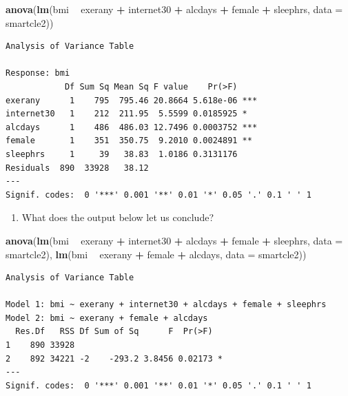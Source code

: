 \documentclass[]{book}
\newenvironment{Shaded}{\begin{snugshade}}{\end{snugshade}}
\newcommand{\KeywordTok}[1]{\textcolor[rgb]{0.13,0.29,0.53}{\textbf{#1}}}
\newcommand{\DataTypeTok}[1]{\textcolor[rgb]{0.13,0.29,0.53}{#1}}
\newcommand{\StringTok}[1]{\textcolor[rgb]{0.31,0.60,0.02}{#1}}
\newcommand{\OperatorTok}[1]{\textcolor[rgb]{0.81,0.36,0.00}{\textbf{#1}}}
\newcommand{\NormalTok}[1]{#1}
\providecommand{\tightlist}{%
  \setlength{\itemsep}{0pt}\setlength{\parskip}{0pt}}
\theoremstyle{definition}
\theoremstyle{definition}
\theoremstyle{definition}
\theoremstyle{remark}
\begin{document}
\begin{Shaded}
\begin{Highlighting}[]
\KeywordTok{anova}\NormalTok{(}\KeywordTok{lm}\NormalTok{(bmi }\OperatorTok{~}\StringTok{ }\NormalTok{exerany }\OperatorTok{+}\StringTok{ }\NormalTok{internet30 }\OperatorTok{+}\StringTok{ }\NormalTok{alcdays }\OperatorTok{+}\StringTok{ }\NormalTok{female }\OperatorTok{+}\StringTok{ }\NormalTok{sleephrs,}
         \DataTypeTok{data =}\NormalTok{ smartcle2))}
\end{Highlighting}
\end{Shaded}

\begin{verbatim}
Analysis of Variance Table

Response: bmi
            Df Sum Sq Mean Sq F value    Pr(>F)    
exerany      1    795  795.46 20.8664 5.618e-06 ***
internet30   1    212  211.95  5.5599 0.0185925 *  
alcdays      1    486  486.03 12.7496 0.0003752 ***
female       1    351  350.75  9.2010 0.0024891 ** 
sleephrs     1     39   38.83  1.0186 0.3131176    
Residuals  890  33928   38.12                      
---
Signif. codes:  0 '***' 0.001 '**' 0.01 '*' 0.05 '.' 0.1 ' ' 1
\end{verbatim}

\begin{enumerate}
\def\labelenumi{\arabic{enumi}.}
\setcounter{enumi}{2}
\tightlist
\item
  What does the output below let us conclude?
\end{enumerate}

\begin{Shaded}
\begin{Highlighting}[]
\KeywordTok{anova}\NormalTok{(}\KeywordTok{lm}\NormalTok{(bmi }\OperatorTok{~}\StringTok{ }\NormalTok{exerany }\OperatorTok{+}\StringTok{ }\NormalTok{internet30 }\OperatorTok{+}\StringTok{ }\NormalTok{alcdays }\OperatorTok{+}\StringTok{ }\NormalTok{female }\OperatorTok{+}\StringTok{ }\NormalTok{sleephrs, }
         \DataTypeTok{data =}\NormalTok{ smartcle2),}
      \KeywordTok{lm}\NormalTok{(bmi }\OperatorTok{~}\StringTok{ }\NormalTok{exerany }\OperatorTok{+}\StringTok{ }\NormalTok{female }\OperatorTok{+}\StringTok{ }\NormalTok{alcdays, }
         \DataTypeTok{data =}\NormalTok{ smartcle2))}
\end{Highlighting}
\end{Shaded}

\begin{verbatim}
Analysis of Variance Table

Model 1: bmi ~ exerany + internet30 + alcdays + female + sleephrs
Model 2: bmi ~ exerany + female + alcdays
  Res.Df   RSS Df Sum of Sq      F  Pr(>F)  
1    890 33928                              
2    892 34221 -2    -293.2 3.8456 0.02173 *
---
Signif. codes:  0 '***' 0.001 '**' 0.01 '*' 0.05 '.' 0.1 ' ' 1
\end{verbatim}
\end{document}
